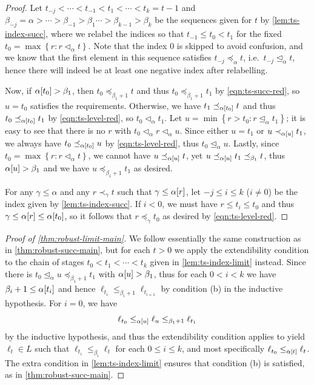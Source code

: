 \documentclass[11pt]{article}
\theoremstyle{plain}
\theoremstyle{definition}
\begin{document}
\begin{proof}
  Let $t_{-j} < \cdots < t_{-1} < t_1 < \cdots < t_k = t - 1$ and $\beta_{-j} = \alpha > \cdots > \beta_{-1} > \beta_1 \cdots > \beta_{k - 1} > \beta_k$ be the sequences given for $t$ by \autoref{lem:ts-index-succ}, where we relabel the indices so that $t_{-1} \leq t_0 < t_1$ for the fixed $t_0 = \max \left\{r : r \lhd_\alpha t\right\}$. Note that the index $0$ is skipped to avoid confusion, and we know that the first element in this sequence satisfies $t_{-j} \preceq_\alpha t$, i.e.\ $t_{-j} \unlhd_\alpha t$, hence there will indeed be at least one negative index after relabelling.

  Now, if $\alpha\mleft[t_0\mright] > \beta_1$, then $t_0 \preceq_{\beta_1 + 1} t$ and thus $t_0 \preceq_{\beta_1 + 1} t_1$ by \autoref{eqn:ts-succ-red}, so $u = t_0$ satisfies the requirements. Otherwise, we have $t_1 \preceq_{\alpha\mleft[t_0\mright]} t$ and thus $t_0 \preceq_{\alpha\mleft[t_0\mright]} t_1$ by \autoref{eqn:ts-level-red}, so $t_0 \lhd_\alpha t_1$. Let $u = \min \left\{r > t_0 : r \unlhd_\alpha t_1\right\}$; it is easy to see that there is no $r$ with $t_0 \lhd_\alpha r \lhd_\alpha u$. Since either $u = t_1$ or $u \prec_{\alpha\mleft[u\mright]} t_1$, we always have $t_0 \preceq_{\alpha\mleft[t_0\mright]} u$ by \autoref{eqn:ts-level-red}, thus $t_0 \unlhd_\alpha u$. Lastly, since $t_0 = \max \left\{r : r \lhd_\alpha t\right\}$, we cannot have $u \preceq_{\alpha\mleft[u\mright]} t$, yet $u \preceq_{\alpha\mleft[u\mright]} t_1 \preceq_{\beta_1} t$, thus $\alpha\mleft[u\mright] > \beta_1$ and we have $u \preceq_{\beta_1 + 1} t_1$ as desired.

  For any $\gamma \leq \alpha$ and any $r \prec_\gamma t$ such that $\gamma \leq \alpha\mleft[r\mright]$, let $-j \leq i \leq k$ ($i \neq 0$) be the index given by \autoref{lem:ts-index-succ}. If $i < 0$, we must have $r \leq t_i \leq t_0$ and thus $\gamma \leq \alpha\mleft[r\mright] \leq \alpha\mleft[t_0\mright]$, so it follows that $r \preceq_\gamma t_0$ as desired by \autoref{eqn:ts-level-red}.
\end{proof}

\begin{proof}[Proof of \autoref{thm:robust-limit-main}]
  We follow essentially the same construction as in \autoref{thm:robust-succ-main}, but for each $t > 0$ we apply the extendibility condition to the chain of stages $t_0 < t_1 < \cdots < t_k$ given in \autoref{lem:ts-index-limit} instead. Since there is $t_0 \unlhd_\alpha u \preceq_{\beta_1 + 1} t_1$ with $\alpha\mleft[u\mright] > \beta_1$, thus for each $0 < i < k$ we have $\beta_i + 1 \leq \alpha\mleft[t_i\mright]$ and hence $\ell_{t_i} \leq_{\beta_i + 1} \ell_{t_{i + 1}}$ by condition (b) in the inductive hypothesis. For $i = 0$, we have
  \[\ell_{t_0} \leq_{\alpha\mleft[u\mright]} \ell_u \leq_{\beta_1 + 1} \ell_{t_1}\]
  by the inductive hypothesis, and thus the extendibility condition applies to yield $\ell_t \in L$ such that $\ell_{t_i} \leq_{\beta_i} \ell_t$ for each $0 \leq i \leq k$, and most specifically $\ell_{t_0} \leq_{\alpha\mleft[t\mright]} \ell_t$. The extra condition in \autoref{lem:ts-index-limit} ensures that condition (b) is satisfied, as in \autoref{thm:robust-succ-main}.
\end{proof}
\end{document}
